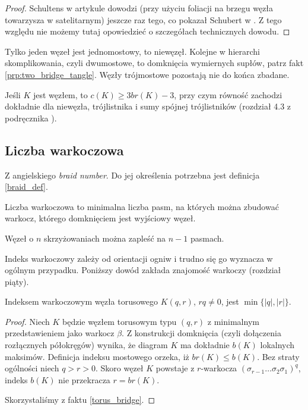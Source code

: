 \begin{proof}
    Schultens w artykule \cite{schultens03} dowodzi (przy użyciu foliacji na brzegu węzła towarzysza w satelitarnym) jeszcze raz tego, co pokazał Schubert w \cite{schubert54}.
    Z tego względu nie możemy tutaj opowiedzieć o szczegółach technicznych dowodu.
\end{proof}

Tylko jeden węzeł jest jednomostowy, to niewęzęł.
Kolejne w hierarchi skomplikowania, czyli dwumostowe,
to domknięcia wymiernych supłów, patrz fakt \ref{prp:two_bridge_tangle}.
Węzły trójmostowe pozostają nie do końca zbadane.

\begin{conjecture}
    Jeśli $K$ jest węzłem, to $c(K) \ge 3 br(K) - 3$, przy czym równość zachodzi dokładnie dla niewęzła, trójlistnika i sumy spójnej trójlistników (rozdział 4.3 z podręcznika \cite{murasugi96}).
\end{conjecture}


\subsection{Liczba warkoczowa} %
\label{sub:braid_number}
Z angielskiego \emph{braid number}.
Do jej określenia potrzebna jest definicja \ref{braid_def}.

\begin{definition}
    Liczba warkoczowa to minimalna liczba pasm, na których można zbudować warkocz, którego domknięciem jest wyjściowy węzeł.
\end{definition}

\begin{proposition}
    Węzeł o $n$ skrzyżowaniach można zapleść na $n - 1$ pasmach.
\end{proposition}

Indeks warkoczowy zależy od orientacji ogniw i trudno się go wyznacza w ogólnym przypadku.
Poniższy dowód zakłada znajomość warkoczy (rozdział piąty).

\begin{proposition}
    Indeksem warkoczowym węzła torusowego $K(q, r)$, $rq \neq 0$, jest $\min\{|q|, |r|\}$.
\end{proposition}

\begin{proof}
Niech $K$ będzie węzłem torusowym typu $(q,r)$ z minimalnym przedstawieniem jako warkocz $\beta$.
Z konstrukcji domknięcia (czyli dołączenia rozłącznych półokręgów) wynika,
że diagram $K$ ma dokładnie $b(K)$ lokalnych maksimów.
Definicja indeksu mostowego orzeka, iż $br(K) \le b(K)$.
Bez straty ogólności niech $q > r > 0$.
Skoro węzeł $K$ powstaje z $r$-warkocza $(\sigma_{r-1} \ldots \sigma_2\sigma_1)^q$,
indeks $b(K)$ nie przekracza $r = br(K)$.

Skorzystaliśmy z faktu \ref{torus_bridge}.
\end{proof}

